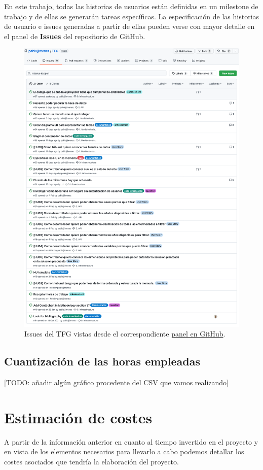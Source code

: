En este trabajo, todas las historias de usuarios están definidas en un milestone
de trabajo y de ellas se generarán tareas específicas. La especificación de las historias de usuario e issues generadas a partir de ellas
pueden verse con mayor detalle en el panel de \textbf{Issues} del repositorio de GitHub.
\begin{figure}[]
	\centering
	\includegraphics[scale=0.3]{doc/logos/imgs/issues.png}
	\caption{ \cite{rtve-cis}  Issues del TFG vistas desde el correspondiente \href{https://github.com/pablojjimenez/TFG/issues}{panel en GitHub}. }
    \label{fig:worst_f_value}
\end{figure}

\subsection{Cuantización de las horas empleadas}
[TODO: añadir algún gráfico procedente del CSV que vamos realizando]

\section{Estimación de costes}
A partir de la información anterior en cuanto al tiempo invertido en el proyecto y en vista de los elementos necesarios
para llevarlo a cabo podemos detallar los costes asociados que tendría la elaboración del proyecto.

